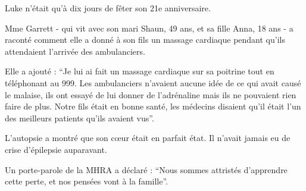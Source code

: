 {Luke n'était qu'à dix jours de fêter son 21e anniversaire.

Mme Garrett - qui vit avec son mari Shaun, 49 ans, et sa fille Anna, 18 ans - a
raconté comment elle a donné à son fils un massage cardiaque pendant qu'ils
attendaient l'arrivée des ambulanciers.

Elle a ajouté : “Je lui ai fait un massage cardiaque sur sa poitrine tout en
téléphonant au 999. Les ambulanciers n'avaient aucune idée de ce qui avait causé
le malaise, ils ont essayé de lui donner de l'adrénaline mais ils ne pouvaient
rien faire de plus. Notre fils était en bonne santé, les médecins disaient qu'il
était l'un des meilleurs patients qu'ils avaient vus”.

L'autopsie a montré que son cœur était en parfait état. Il n'avait jamais eu de
crise d'épilepsie auparavant.

Un porte-parole de la MHRA a déclaré : “Nous sommes attristés d'apprendre cette
perte, et nos pensées vont à la famille”.

}

